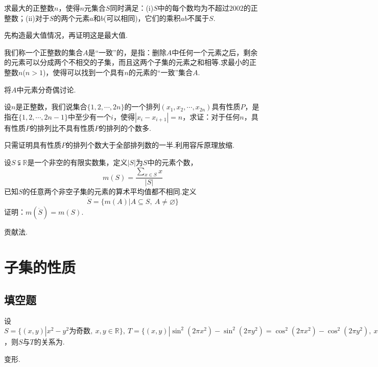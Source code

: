 \documentclass[cn,hazy,black,10pt,normal]{elegantnote}
\newcommand{\tk}{\uline{\hspace{4em}}}
\newcommand{\R}{\mathbb{R}}
\begin{document}
\begin{problem} %
	求最大的正整数$n$，使得$n$元集合$S$同时满足：(i)$S$中的每个数均为不超过$2002$的正整数；(ii)对于$S$的两个元素$a$和$b$(可以相同)，它们的乘积$ab$不属于$S$.
\end{problem}
\begin{hint}
	先构造最大值情况，再证明这是最大值.
\end{hint}

\begin{problem} %
	我们称一个正整数的集合$A$是“一致”的，是指：删除$A$中任何一个元素之后，剩余的元素可以分成两个不相交的子集，而且这两个子集的元素之和相等.求最小的正整数$n$($n>1$)，使得可以找到一个具有$n$的元素的“一致”集合$A$.
\end{problem}
\begin{hint}
	将$A$中元素分奇偶讨论.
\end{hint}

\begin{problem} %
	设$n$是正整数，我们说集合$\{ 1,2, \cdots ,2n \}$的一个排列$(x_1,x_2, \cdots ,x_{2n})$具有性质$P$，是指在$\{ 1,2, \cdots ,2n-1 \}$中至少有一个$i$，使得$|x_i-x_{i+1}|=n$，求证：对于任何$n$，具有性质$P$的排列比不具有性质$P$的排列的个数多.
\end{problem}
\begin{hint}
	只需证明具有性质$P$的排列个数大于全部排列数的一半.利用容斥原理放缩.
\end{hint}

\begin{problem} %
	设$S \subsetneqq \mathbb{R}$是一个非空的有限实数集，定义$|S|$为$S$中的元素个数，$$m(S) = \frac{\sum_{x \in S} x}{|S|}$$
	已知$S$的任意两个非空子集的元素的算术平均值都不相同.定义$$\dot{S} = \{ m(A) | A \subseteq S, ~A \neq \varnothing \}$$
	证明：$m(\dot{S}) = m(S)$.
\end{problem}
\begin{hint}
	贡献法.
\end{hint}

\newpage
\section{子集的性质}

\subsection*{填空题}

\begin{problem} %
	设$S=\{ (x,y)|x^2-y^2 \text{为奇数},~x,y \in \R \},~ T=\{ (x,y)|\sin ^2 (2\pi x^2) - \sin ^2 (2\pi y^2) = \cos ^2 (2\pi x^2) - \cos ^2 (2\pi y^2),~ x,y \in \R \}$，则$S$与$T$的关系为\tk .
\end{problem}
\begin{hint}
	变形.
\end{hint}
\end{document}
